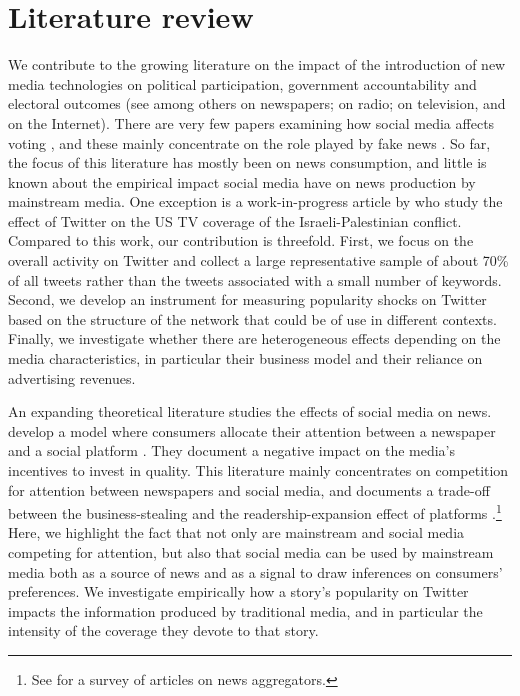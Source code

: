 \section{Literature review}

We contribute to the growing literature on the impact of the introduction of new media technologies on political participation, government accountability and electoral outcomes (see among others \citet{Gentzkowetal2011,SnyderStromberg2010} on newspapers; \citet{Stromberg2004} on radio; \citet{Gentzkow2006,AngelucciCage2019,AngelucciCageSinkinson2020} on television, and \citet{BoxellGentzkowShapiro2018,Gavazzaetal2019} on the Internet). There are very few papers examining how social media affects voting \citep[for a review of the literature see][]{Zhuravskayaetal2020}, and these mainly concentrate on the role played by fake news \citep{AllcottGentzkow2017}. So far, the focus of this literature has mostly been on news consumption, and little is known about the empirical impact social media have on news production by mainstream media. One exception is a work-in-progress article by \citet{HatteMadinierZhuravskaya2020}  who study the effect of Twitter on the US  TV coverage of the Israeli-Palestinian conflict. Compared to this work, our contribution is threefold. First, we focus on the overall activity on Twitter and collect a large representative sample of about 70\% of all tweets rather than the tweets associated with a small number of keywords. Second, we develop an instrument for measuring popularity shocks on Twitter based on the structure of the network that could be of use in different contexts. Finally, we investigate whether there are heterogeneous effects depending on the media characteristics, in particular their business model and their reliance on advertising revenues.

An expanding theoretical literature studies the effects of social media on news.  develop a model where consumers allocate their attention between a newspaper and a social platform \citep[see also][for a theory of news coverage in environments of information abundance]{AlaouiGermano2020}. They document a negative impact on the media's incentives to invest in quality. This literature mainly concentrates on competition for attention between newspapers and social media, and documents a trade-off between the business-stealing and the readership-expansion effect of platforms \citep{JeonNasr2016}.\footnote{See \citet{Jeon2018} for a survey of articles on news aggregators.}  Here, we highlight the fact that not only are mainstream and social media competing for attention, but also that social media can be used by mainstream media both as a source of news and as a signal to draw inferences on consumers' preferences. We investigate empirically how a story's popularity on Twitter impacts the information produced by traditional media, and in particular the intensity of the coverage they devote to that story.

